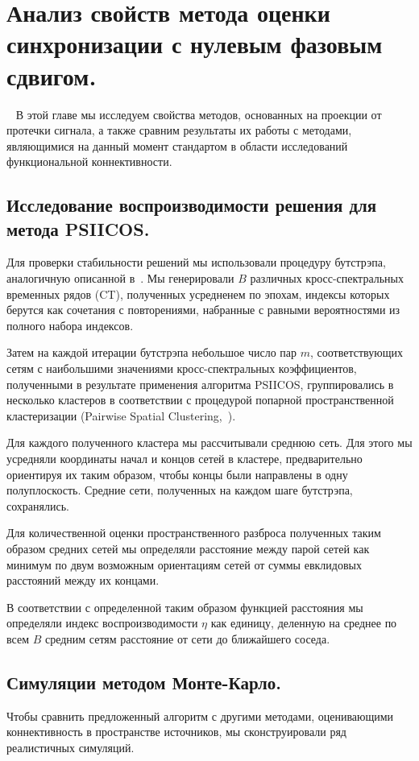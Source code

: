 \chapter{Анализ свойств метода оценки синхронизации с нулевым фазовым сдвигом.}~\label{chapt3}
В этой главе мы исследуем свойства методов, основанных на проекции от протечки сигнала,
а также сравним результаты их работы с методами, являющимися на данный
момент стандартом в области исследований функциональной коннективности.

\section{Исследование воспроизводимости решения для метода PSIICOS.}\label{sec:bootstrap}
Для проверки стабильности решений мы использовали процедуру бутстрэпа, аналогичную
описанной в~\cite{Darvas2005}.
Мы генерировали $B$ различных кросс-спектральных временных рядов (CT), полученных
усредненем по эпохам, индексы которых берутся как сочетания с повторениями, набранные
с равными вероятностями из полного набора индексов.

Затем на каждой итерации бутстрэпа небольшое
число пар $m$, соответствующих сетям с наибольшими
значениями кросс-спектральных коэффициентов, полученными в результате применения
алгоритма PSIICOS, группировались в несколько кластеров в соответствии с процедурой
попарной пространственной кластеризации (Pairwise Spatial Clustering,~\cite{Zalesky2012}).

Для каждого полученного кластера мы рассчитывали среднюю сеть. Для этого мы усредняли
координаты начал и концов сетей в кластере, предварительно ориентируя их таким
образом, чтобы концы были направлены в одну полуплоскость.
Средние сети, полученных на каждом шаге бутстрэпа, сохранялись.

Для количественной оценки пространственного разброса полученных таким образом средних сетей
мы определяли расстояние между парой сетей как минимум по двум возможным ориентациям
сетей от суммы евклидовых расстояний между их концами.

В соответствии с определенной таким образом функцией расстояния мы определяли индекс
воспроизводимости $\eta$ как единицу, деленную на среднее по всем $B$ средним сетям расстояние
от сети до ближайшего соседа.

\section{Симуляции методом Монте-Карло.}\label{sec:monte_carlo_simulation}
Чтобы сравнить предложенный алгоритм с другими методами, оценивающими коннективность
в пространстве источников, мы сконструировали ряд реалистичных симуляций.

